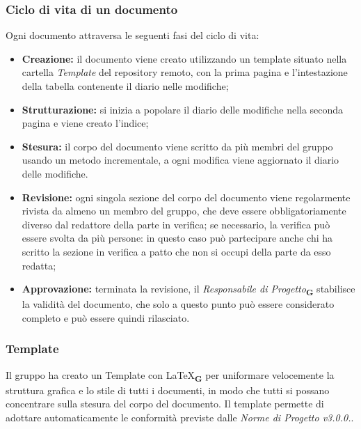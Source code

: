 \subsubsection{Ciclo di vita di un documento}
Ogni documento attraversa le seguenti fasi del ciclo di vita:
\begin{itemize}
    \item \textbf{Creazione:} il documento viene creato utilizzando un template situato nella cartella \textit{Template} del repository remoto, con la prima pagina e l'intestazione della tabella contenente il diario nelle modifiche;
    \item \textbf{Strutturazione:} si inizia a popolare il diario delle modifiche nella seconda pagina e viene creato l'indice;
    \item \textbf{Stesura:} il corpo del documento viene scritto da più membri del gruppo usando un metodo incrementale, a ogni modifica viene aggiornato il diario delle modifiche.
    \item \textbf{Revisione:} ogni singola sezione del corpo del documento viene regolarmente rivista da almeno un membro del gruppo, che deve essere obbligatoriamente diverso dal redattore della parte in verifica; se necessario, la verifica può essere svolta da più persone: in questo caso può partecipare anche chi ha scritto la sezione in verifica a patto che non si occupi della parte da esso redatta;
    \item \textbf{Approvazione:} terminata la revisione, il \textit{Responsabile di Progetto}\textsubscript{\textbf{G}} stabilisce la validità del documento, che solo a questo punto può essere considerato completo e può essere quindi rilasciato.
\end{itemize}
\subsubsection{Template}
Il gruppo ha creato un Template con \LaTeX\textsubscript{\textbf{G}} per uniformare velocemente la struttura grafica e lo stile di tutti i documenti, in modo che tutti si possano concentrare sulla stesura del corpo del documento. Il template permette di adottare automaticamente le conformità previste dalle \textit{Norme di Progetto v3.0.0.}.
